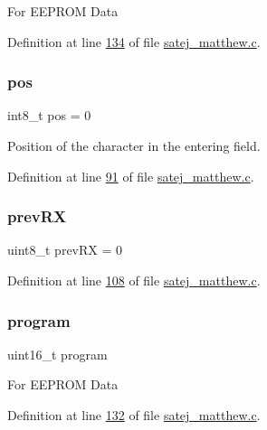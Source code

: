 For E\+E\+P\+R\+OM Data 

Definition at line \mbox{\hyperlink{satej__matthew_8c_source_l00134}{134}} of file \mbox{\hyperlink{satej__matthew_8c_source}{satej\+\_\+matthew.\+c}}.

\mbox{\label{satej__matthew_8c_a74d38abb1cb2f27f78ca059e24654b5e}} 
\subsubsection{\texorpdfstring{pos}{pos}}
{\footnotesize\ttfamily int8\+\_\+t pos = 0}

Position of the character in the entering field. 

Definition at line \mbox{\hyperlink{satej__matthew_8c_source_l00091}{91}} of file \mbox{\hyperlink{satej__matthew_8c_source}{satej\+\_\+matthew.\+c}}.

\mbox{\label{satej__matthew_8c_a568ff7da7fe7f4ceef3555f2465a3cc7}} 
\subsubsection{\texorpdfstring{prevRX}{prevRX}}
{\footnotesize\ttfamily uint8\+\_\+t prev\+RX = 0}



Definition at line \mbox{\hyperlink{satej__matthew_8c_source_l00108}{108}} of file \mbox{\hyperlink{satej__matthew_8c_source}{satej\+\_\+matthew.\+c}}.

\mbox{\label{satej__matthew_8c_a66ab3de6d3d072bd8495172c02a442f0}} 
\subsubsection{\texorpdfstring{program}{program}}
{\footnotesize\ttfamily uint16\+\_\+t program}

For E\+E\+P\+R\+OM Data 

Definition at line \mbox{\hyperlink{satej__matthew_8c_source_l00132}{132}} of file \mbox{\hyperlink{satej__matthew_8c_source}{satej\+\_\+matthew.\+c}}.

\mbox{\label{satej__matthew_8c_ab6c75a184c9e2f11ff1237e857250b3d}} 
